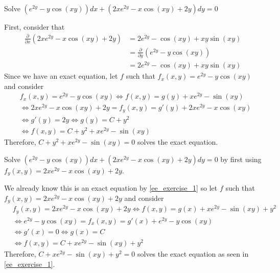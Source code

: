 \documentclass[notes.tex]{subfiles}
\begin{document}
\begin{exercise} \label{ee_exercise_1}
    Solve $(e^{2y} - y\cos(xy))dx + (2xe^{2y} - x\cos(xy) + 2y)dy = 0$
\end{exercise}
\begin{solution}
    First, consider that
    \begin{align*}
        \frac{\partial}{\partial x} (2xe^{2y} - x\cos(xy) + 2y)
        &= 2e^{2y} - \cos(xy) + xy\sin(xy) \\
        &= \frac{\partial}{\partial y} (e^{2y} - y\cos(xy)) \\
        &= 2e^{2y} - \cos(xy) + xy\sin(xy)
    \end{align*}
    Since we have an exact equation, let $f$ such that $f_x(x, y) = e^{2y} - y\cos(xy)$ and consider
    \begin{align*}
        &f_x(x, y) = e^{2y} - y\cos(xy)
        \iff f(x, y) = g(y) + x e^{2y} - \sin(xy) \\
        &\iff 2xe^{2y} - x\cos(xy) + 2y = f_y(x, y) = g'(y) + 2x e^{2y} - x\cos(xy) \\
        &\iff g'(y) = 2y
        \iff g(y) = C + y^2 \\
        &\iff f(x, y) = C + y^2 + x e^{2y} - \sin(xy)
    \end{align*}
    Therefore, $C + y^2 + x e^{2y} - \sin(xy) = 0$ solves the exact equation.
\end{solution}

\begin{exercise}
    Solve $(e^{2y} - y\cos(xy))dx + (2xe^{2y} - x\cos(xy) + 2y)dy = 0$ by first using $f_y(x, y) = 2xe^{2y} - x\cos(xy) + 2y$.
\end{exercise}
\begin{solution}
    We already know this is an exact equation by \cref{ee_exercise_1} so let $f$ such that $f_y(x, y) = 2xe^{2y} - x\cos(xy) + 2y$ and consider
    \begin{align*}
        &f_y(x, y) = 2xe^{2y} - x\cos(xy) + 2y
        \iff f(x, y) = g(x) + xe^{2y} - \sin(xy) + y^2 \\
        &\iff e^{2y} - y\cos(xy) = f_x(x, y) = g'(x) + e^{2y} - y\cos(xy) \\
        &\iff g'(x) = 0
        \iff g(x) = C \\
        &\iff f(x, y) = C + xe^{2y} - \sin(xy) + y^2
    \end{align*}
    Therefore, $C + xe^{2y} - \sin(xy) + y^2 = 0$ solves the exact equation as seen in \cref{ee_exercise_1}.
\end{solution}
\end{document}
